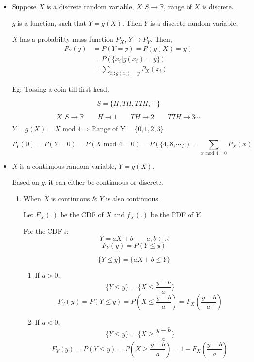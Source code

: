 \documentclass{article}
\begin{document}
\begin{itemize}
    \item
    Suppose $X$ is a discrete random variable, $X: S \to \mathbb{R}$, range of $X$ is discrete.

    $g$ is a function, such that $Y=g(X)$. Then $Y$ is a discrete random variable.

    $X$ has a probability mass function $P_X$, $Y \to P_Y$. Then,
    \begin{align*}
        P_Y(y)&= P(Y=y)= P(g(X)=y) \\
        &= P(\{ x_i | g(x_i)=y\}) \\
        &= \sum_{x_i : g(x_i)=y} P_X(x_i)
    \end{align*}

    Eg: Tossing a coin till first head.

    $$ S= \{ H,TH,TTH, \cdots\}$$

    $$X:S \to \mathbb{R}\qquad H \to 1 \qquad TH \to 2 \qquad TTH \to 3 \cdots$$

    $Y=g(X)= X \text{ mod } 4 \Rightarrow \text{Range of Y}= \{ 0,1,2,3\}$

    $$P_Y(0)= P(Y=0)= P(X \text{ mod } 4 =0)= P(\{ 4,8,\cdots\})= \sum_{x \text{ mod } 4=0}P_X(x)$$

    \item $X$ is a continuous random variable, $Y= g(X)$.

    Based on $g$, it can either be continuous or discrete.

    \begin{enumerate}
        \item When $X$ is continuous \& $Y$ is also continuous.

        Let $F_X(.)$ be the CDF of $X$ and $f_X(.)$ be the PDF of $Y$.

        For the CDF's:
        $$ Y= aX+b \qquad a,b \in \mathbb{R}$$
            $$F_Y(y)= P(Y \leq y) $$

        $$ \{ Y \leq y\}= \{ aX+b \leq Y\}$$
        \begin{enumerate}
            \item If $a>0$,
            $$ \{ Y \leq y\}  = \{ X \leq \frac{y-b}{a}\}$$
            $$ F_Y(y)= P(Y \leq y)= P\left( X \leq \frac{y-b}{a}\right)= F_X\left( \frac{y-b}{a}\right)$$
            \item If $a<0$,
            $$ \{ Y \leq y\}  = \{ X \geq \frac{y-b}{a}\}$$
            $$ F_Y(y)= P(Y \leq y)= P\left( X \geq \frac{y-b}{a}\right)= 1-F_X\left( \frac{y-b}{a}\right)$$
        \end{enumerate}


\end{enumerate}
\end{itemize}
\end{document}
